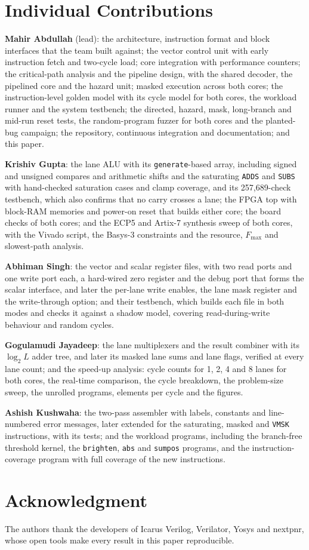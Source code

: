 \section*{Individual Contributions}
\textbf{Mahir Abdullah} (lead): the architecture, instruction format and block interfaces
that the team built against; the vector control unit with early instruction fetch and
two-cycle load; core integration with performance counters; the critical-path analysis
and the pipeline design, with the shared decoder, the pipelined core and the hazard unit;
masked execution across both cores; the instruction-level golden model with its cycle
model for both cores, the workload runner and the system testbench; the directed, hazard,
mask, long-branch and mid-run reset tests, the random-program fuzzer for both cores and
the planted-bug campaign; the repository, continuous integration and documentation; and
this paper.

\textbf{Krishiv Gupta}: the lane ALU with its \texttt{generate}-based array, including
signed and unsigned compares and arithmetic shifts and the saturating \texttt{ADDS} and
\texttt{SUBS} with hand-checked saturation cases and clamp coverage, and its 257,689-check
testbench, which also confirms that no carry crosses a lane; the FPGA top with block-RAM
memories and power-on reset that builds either core; the board checks of both cores; and
the ECP5 and Artix-7 synthesis sweep of both cores, with the Vivado script, the Basys-3
constraints and the resource, $F_{\max}$ and slowest-path analysis.

\textbf{Abhiman Singh}: the vector and scalar register files, with two read ports and
one write port each, a hard-wired zero register and the debug port that forms the scalar
interface, and later the per-lane write enables, the lane mask register and the
write-through option; and their testbench, which builds each file in both modes and
checks it against a shadow model, covering read-during-write behaviour and random
cycles.

\textbf{Gogulamudi Jayadeep}: the lane multiplexers and the result combiner with its
$\log_2 L$ adder tree, and later its masked lane sums and lane flags, verified at every
lane count; and the speed-up analysis: cycle counts for 1, 2, 4 and 8 lanes for both
cores, the real-time comparison, the cycle breakdown, the problem-size sweep, the unrolled
programs, elements per cycle and the figures.

\textbf{Ashish Kushwaha}: the two-pass assembler with labels, constants and
line-numbered error messages, later extended for the saturating, masked and
\texttt{VMSK} instructions, with its tests; and the workload programs, including the
branch-free threshold kernel, the \texttt{brighten}, \texttt{abs} and \texttt{sumpos}
programs, and the instruction-coverage program with full coverage of the new
instructions.

\section*{Acknowledgment}
The authors thank the developers of Icarus Verilog, Verilator, Yosys and nextpnr, whose
open tools make every result in this paper reproducible.
